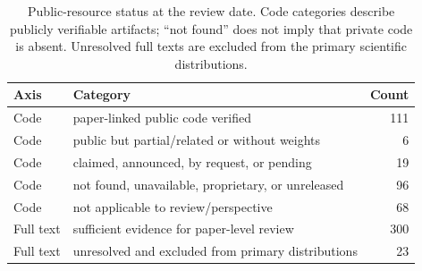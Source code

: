 \begin{table}[t]
\caption{Public-resource status at the review date. Code categories describe publicly verifiable artifacts; ``not found'' does not imply that private code is absent. Unresolved full texts are excluded from the primary scientific distributions.}
\label{tab:openness}
\centering
\small
\begin{tabular}{p{1.7cm}p{7.0cm}r}
\toprule
\textbf{Axis} & \textbf{Category} & \textbf{Count} \\
\midrule
Code & paper-linked public code verified & 111 \\
Code & public but partial/related or without weights & 6 \\
Code & claimed, announced, by request, or pending & 19 \\
Code & not found, unavailable, proprietary, or unreleased & 96 \\
Code & not applicable to review/perspective & 68 \\
Full text & sufficient evidence for paper-level review & 300 \\
Full text & unresolved and excluded from primary distributions & 23 \\
\bottomrule
\end{tabular}
\end{table}
